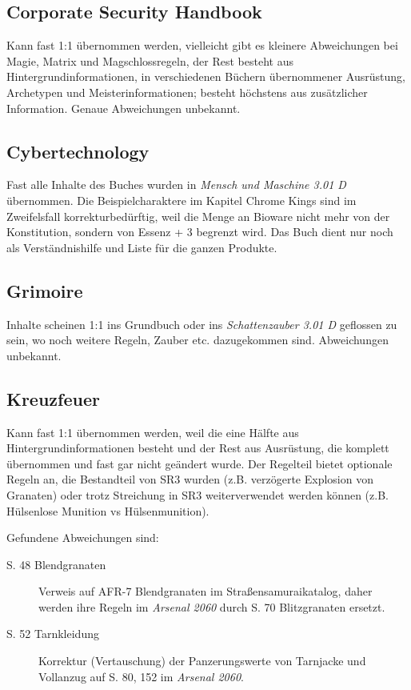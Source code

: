 \documentclass[a4paper]{scrartcl}
\begin{document}
\subsection{Corporate Security Handbook}
Kann fast 1:1 übernommen werden, vielleicht gibt es kleinere Abweichungen bei Magie, Matrix und Magschlossregeln, der Rest besteht aus Hintergrundinformationen, in verschiedenen Büchern übernommener Ausrüstung, Archetypen und Meisterinformationen; besteht höchstens aus zusätzlicher Information. Genaue Abweichungen unbekannt.

\subsection{Cybertechnology}
Fast alle Inhalte des Buches wurden in \textit{Mensch und Maschine 3.01 D} übernommen. Die Beispielcharaktere im Kapitel Chrome Kings sind im Zweifelsfall korrekturbedürftig, weil die Menge an Bioware nicht mehr von der Konstitution, sondern von Essenz + 3 begrenzt wird. Das Buch dient nur noch als Verständnishilfe und Liste für die ganzen Produkte.

\subsection{Grimoire}
Inhalte scheinen 1:1 ins Grundbuch oder ins \textit{Schattenzauber 3.01 D} geflossen zu sein, wo noch weitere Regeln, Zauber etc. dazugekommen sind. Abweichungen unbekannt.

\subsection{Kreuzfeuer}
Kann fast 1:1 übernommen werden, weil die eine Hälfte aus Hintergrundinformationen besteht und der Rest aus Ausrüstung, die komplett übernommen und fast gar nicht geändert wurde. Der Regelteil bietet optionale Regeln an, die Bestandteil von SR3 wurden (z.B. verzögerte Explosion von Granaten) oder trotz Streichung in SR3 weiterverwendet werden können (z.B. Hülsenlose Munition vs Hülsenmunition).

Gefundene Abweichungen sind:
\begin{description}
 \item[S. 48 Blendgranaten] Verweis auf AFR-7 Blendgranaten im Straßensamuraikatalog, daher werden ihre Regeln im \textit{Arsenal 2060} durch S. 70 Blitzgranaten ersetzt.
 \item[S. 52 Tarnkleidung] Korrektur (Vertauschung) der Panzerungswerte von Tarnjacke und Vollanzug auf S. 80, 152 im \textit{Arsenal 2060}.
\end{description}
\end{document}
